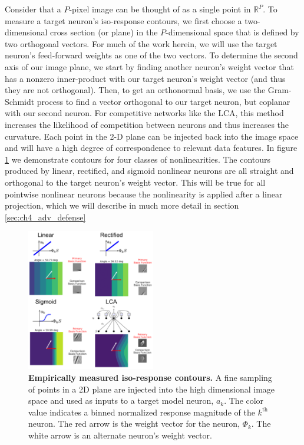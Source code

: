 Consider that a $P$-pixel image can be thought of as a single point in $\mathbb{R}^{P}$.
To measure a target neuron's iso-response contours, we first choose a two-dimensional cross section (or plane) in the $P$-dimensional space that is defined by two orthogonal vectors.
For much of the work herein, we will use the target neuron's feed-forward weights as one of the two vectors.
To determine the second axis of our image plane, we start by finding another neuron’s weight vector that has a nonzero inner-product with our target neuron’s weight vector (and thus they are not orthogonal).
Then, to get an orthonormal basis, we use the Gram-Schmidt process to find a vector orthogonal to our target neuron, but coplanar with our second neuron.
For competitive networks like the LCA, this method increases the likelihood of competition between neurons and thus increases the curvature. 
Each point in the 2-D plane can be injected back into the image space and will have a high degree of correspondence to relevant data features.
In figure \ref{fig:ch4_iso_contours} we demonstrate contours for four classes of nonlinearities.
The contours produced by linear, rectified, and sigmoid nonlinear neurons are all straight and orthogonal to the target neuron's weight vector.
This will be true for all pointwise nonlinear neurons because the nonlinearity is applied after a linear projection, which we will describe in much more detail in section \ref{sec:ch4_adv_defense}

\begin{figure}[h]
    \centering
    \includegraphics[width=0.5\textwidth]{figures/iso_contour_comparison.png}
    \caption{\textbf{Empirically measured iso-response contours.} A fine sampling of points in a 2D plane are injected into the high dimensional image space and used as inputs to a target model neuron, $a_{k}$. The color value indicates a binned normalized response magnitude of the $k^{\text{th}}$ neuron. The red arrow is the weight vector for the neuron, $\Phi_{k}$. The white arrow is an alternate neuron's weight vector.}
    \label{fig:ch4_iso_contours}
\end{figure}

